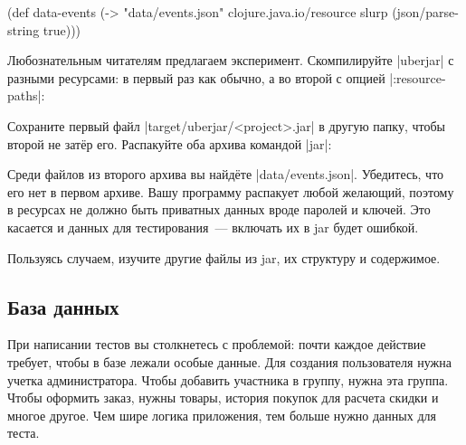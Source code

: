 \begin{english}
  \begin{clojure}
(def data-events
  (-> "data/events.json"
      clojure.java.io/resource
      slurp
      (json/parse-string true)))
  \end{clojure}
\end{english}


Любознательным читателям предлагаем эксперимент. Скомпилируйте \spverb|uberjar|
с разными ресурсами: в первый раз как обычно, а во второй с опцией
\spverb|:resource-paths|:

\begin{english}
  \begin{clojure}
:profiles {:uberjar {:resource-paths ["env/test/resources"]}
  \end{clojure}
\end{english}


Сохраните первый файл \spverb|target/uberjar/<project>.jar| в другую папку,
чтобы второй не зат\"{е}р его. Распакуйте оба архива командой \spverb|jar|:

\begin{english}
\end{english}

Среди файлов из второго архива вы найд\"{е}те \spverb|data/events.json|. Убедитесь,
что его нет в первом архиве. Вашу программу распакует любой желающий, поэтому в
ресурсах не должно быть приватных данных вроде паролей и ключей. Это касается и
данных для тестирования~--- включать их в jar будет ошибкой.

Пользуясь случаем, изучите другие файлы из jar, их структуру и содержимое.

\subsection{База данных}


При написании тестов вы столкнетесь с проблемой: почти каждое действие требует,
чтобы в базе лежали особые данные. Для создания пользователя нужна учетка
администратора. Чтобы добавить участника в группу, нужна эта группа. Чтобы
оформить заказ, нужны товары, история покупок для расчета скидки и многое
другое. Чем шире логика приложения, тем больше нужно данных для теста.

